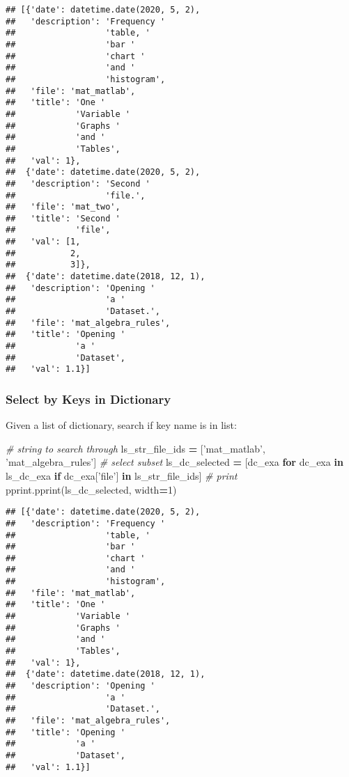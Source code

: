 \documentclass[
]{book}
\newenvironment{Shaded}{\begin{snugshade}}{\end{snugshade}}
\newcommand{\CommentTok}[1]{\textcolor[rgb]{0.56,0.35,0.01}{\textit{#1}}}
\newcommand{\ControlFlowTok}[1]{\textcolor[rgb]{0.13,0.29,0.53}{\textbf{#1}}}
\newcommand{\DecValTok}[1]{\textcolor[rgb]{0.00,0.00,0.81}{#1}}
\newcommand{\KeywordTok}[1]{\textcolor[rgb]{0.13,0.29,0.53}{\textbf{#1}}}
\newcommand{\NormalTok}[1]{#1}
\newcommand{\OperatorTok}[1]{\textcolor[rgb]{0.81,0.36,0.00}{\textbf{#1}}}
\newcommand{\StringTok}[1]{\textcolor[rgb]{0.31,0.60,0.02}{#1}}
\begin{document}
\begin{verbatim}
## [{'date': datetime.date(2020, 5, 2),
##   'description': 'Frequency '
##                  'table, '
##                  'bar '
##                  'chart '
##                  'and '
##                  'histogram',
##   'file': 'mat_matlab',
##   'title': 'One '
##            'Variable '
##            'Graphs '
##            'and '
##            'Tables',
##   'val': 1},
##  {'date': datetime.date(2020, 5, 2),
##   'description': 'Second '
##                  'file.',
##   'file': 'mat_two',
##   'title': 'Second '
##            'file',
##   'val': [1,
##           2,
##           3]},
##  {'date': datetime.date(2018, 12, 1),
##   'description': 'Opening '
##                  'a '
##                  'Dataset.',
##   'file': 'mat_algebra_rules',
##   'title': 'Opening '
##            'a '
##            'Dataset',
##   'val': 1.1}]
\end{verbatim}

\hypertarget{select-by-keys-in-dictionary}{%
\subsubsection{Select by Keys in Dictionary}\label{select-by-keys-in-dictionary}}

Given a list of dictionary, search if key name is in list:

\begin{Shaded}
\begin{Highlighting}[]
\CommentTok{# string to search through}
\NormalTok{ls_str_file_ids }\OperatorTok{=}\NormalTok{ [}\StringTok{'mat_matlab'}\NormalTok{, }\StringTok{'mat_algebra_rules'}\NormalTok{]}
\CommentTok{# select subset}
\NormalTok{ls_dc_selected }\OperatorTok{=}\NormalTok{ [dc_exa}
                  \ControlFlowTok{for}\NormalTok{ dc_exa }\KeywordTok{in}\NormalTok{ ls_dc_exa}
                  \ControlFlowTok{if}\NormalTok{ dc_exa[}\StringTok{'file'}\NormalTok{] }\KeywordTok{in}\NormalTok{ ls_str_file_ids]}
\CommentTok{# print}
\NormalTok{pprint.pprint(ls_dc_selected, width}\OperatorTok{=}\DecValTok{1}\NormalTok{)}
\end{Highlighting}
\end{Shaded}

\begin{verbatim}
## [{'date': datetime.date(2020, 5, 2),
##   'description': 'Frequency '
##                  'table, '
##                  'bar '
##                  'chart '
##                  'and '
##                  'histogram',
##   'file': 'mat_matlab',
##   'title': 'One '
##            'Variable '
##            'Graphs '
##            'and '
##            'Tables',
##   'val': 1},
##  {'date': datetime.date(2018, 12, 1),
##   'description': 'Opening '
##                  'a '
##                  'Dataset.',
##   'file': 'mat_algebra_rules',
##   'title': 'Opening '
##            'a '
##            'Dataset',
##   'val': 1.1}]
\end{verbatim}
\end{document}
